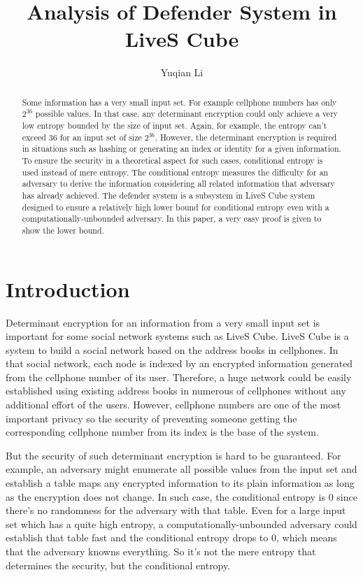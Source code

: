 \documentclass[10pt,a4paper]{article}
\author{Yuqian Li}
\title{Analysis of Defender System in LiveS Cube}
\date{}
\begin{document}
\maketitle
\begin{abstract}
	Some information has a very small input set. For example
	cellphone numbers has only $2^{36}$ possible values. In that case, any
	determinant encryption could only
	achieve a very low entropy bounded by the size of input set.
	Again, for example, the entropy can't exceed $36$ for an input set
	of size $2^{36}$. However, the determinant encryption is required
	in situations such as hashing or generating an index or identity for a
	given information. To ensure the security in a theoretical aspect
	for such cases, conditional entropy is used instead of mere entropy.
	The conditional entropy measures the difficulty for an adversary to
	derive the information considering all related information 
	that adversary has already achieved.
	The defender system is a subsystem in LiveS Cube system
	designed to ensure a relatively high lower
	bound for conditional entropy even with a computationally-unbounded adversary.
	In this paper, a very easy proof is given to show the lower bound.
\end{abstract}

\section{Introduction}
	Determinant encryption for an information from
	a very small input set is important for some social
	network systems such as LiveS Cube. LiveS Cube is a system to
	build a social network based on the address books in cellphones.
	In that social network, each node is indexed by an encrypted information generated
	from the cellphone number
	of its user. Therefore, a huge network could be easily established
	using existing address books in numerous of cellphones without
	any additional effort of the users. However, cellphone numbers are
	one of the most important privacy so the security of preventing
	someone getting the corresponding cellphone number from its index 
	is the base of the system.
	
	But the security
	of such determinant encryption is hard to be guaranteed. For example, an
	adversary might enumerate all possible values from the
	input set and establish a table maps any encrypted
	information to its plain information as long as the encryption
	does not change. In such case, the conditional entropy
	is $0$ since there's no randomness for the adversary with that table.
	Even for a large input set which has a quite high entropy, a
	computationally-unbounded adversary could establish that table
	fast and the conditional entropy drops to $0$, which means that the
	adversary knowns everything. So it's not the mere entropy that
	determines the security, but the conditional entropy.
	
\end{document}

